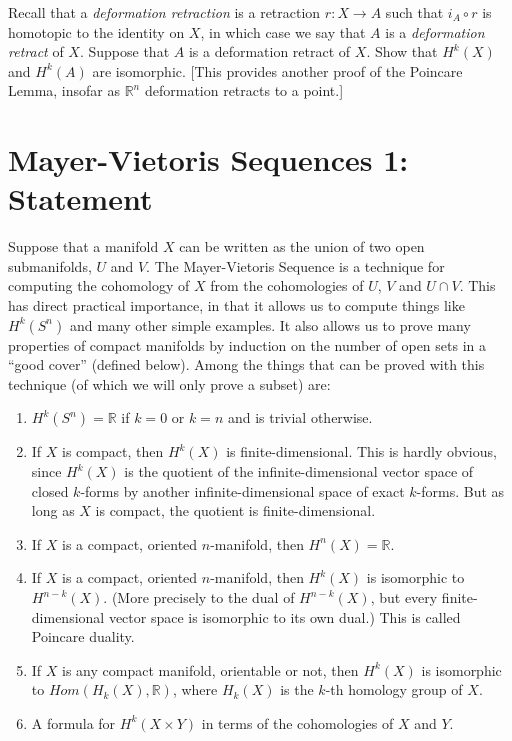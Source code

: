 \documentclass[12pt]{amsbook}
\newcommand{\R}{{\mathbb R}}
\theoremstyle{definition}
\begin{document}
\smallskip

 Recall that a {\em deformation retraction} is 
a retraction $r: X \to A$ such that $i_A \circ r$ is homotopic 
to the identity on $X$, in which case we say that $A$ is a {\em deformation retract} of $X$. 
Suppose that $A$ is a deformation retract of 
$X$. Show that $H^k(X)$ and $H^k(A)$ are isomorphic. [This provides another
proof of the Poincare Lemma, insofar as $\R^n$ deformation retracts to a point.]

\section{Mayer-Vietoris Sequences 1: Statement}

Suppose that a manifold $X$ can be written as the union of two open 
submanifolds, $U$ and $V$. 
The Mayer-Vietoris Sequence is a technique for computing the cohomology
of $X$ from the cohomologies of $U$, $V$ and $U \cap V$. This has direct
practical importance, in that it allows us to compute things like 
$H^k(S^n)$ and many other simple examples. It also allows us to prove many
properties of compact manifolds by induction on the number of open sets in 
a ``good cover'' (defined below). Among the things that can be proved with
this technique (of which we will only prove a subset) are:
\begin{enumerate}
\item $H^k(S^n)=\R$ if $k=0$ or $k=n$ and is trivial otherwise. 
\item If $X$ is compact, then $H^k(X)$ is finite-dimensional. This is hardly
obvious, since $H^k(X)$ is the quotient of the infinite-dimensional vector
space of closed $k$-forms by another infinite-dimensional space of exact 
$k$-forms. But as long as $X$ is compact, the quotient is finite-dimensional.
\item If $X$ is a compact, oriented $n$-manifold, then $H^n(X)=\R$. 
\item If $X$ is a compact, oriented $n$-manifold, then $H^k(X)$ is isomorphic
to $H^{n-k}(X)$. (More precisely to the dual of $H^{n-k}(X)$, but every
finite-dimensional vector space is isomorphic to its own dual.) This is 
called Poincare duality. 
\item If $X$ is any compact manifold, orientable or not, then $H^k(X)$ is 
isomorphic to $Hom(H_k(X),\R)$, where $H_k(X)$ is the $k$-th homology group
of $X$. 
\item A formula for $H^k(X \times Y)$ in terms of the cohomologies of $X$ and 
$Y$. 
\end{enumerate}
\end{document}
